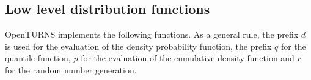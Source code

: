 

\newpage
{}
\subsection{Low level distribution functions}
OpenTURNS implements the following functions. As a general rule, the
prefix $d$ is used for the evaluation of the density probability
function, the prefix $q$ for the quantile function, $p$ for the
evaluation of the cumulative density function and $r$ for the
random number generation.

